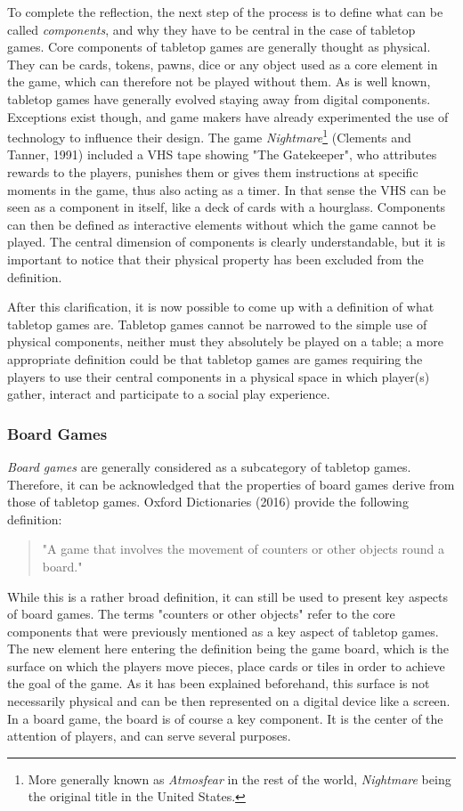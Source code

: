 To complete the reflection, the next step of the process is to define what can be called \textit{components}, and why they have to be central in the case of tabletop games. Core components of tabletop games are generally thought as physical. They can be cards, tokens, pawns, dice or any object used as a core element in the game, which can therefore not be played without them. As is well known, tabletop games have generally evolved staying away from digital components. Exceptions exist though, and game makers have already experimented the use of technology to influence their design. The game \textit{Nightmare}\footnote{More generally known as \textit{Atmosfear} in the rest of the world, \textit{Nightmare} being the original title in the United States.} (Clements and Tanner, 1991)\cite{game:atmo} included a VHS tape showing "The Gatekeeper", who attributes rewards to the players, punishes them or gives them instructions at specific moments in the game, thus also acting as a timer. In that sense the VHS can be seen as a component in itself, like a deck of cards with a hourglass.
Components can then be defined as interactive elements without which the game cannot be played. The central dimension of components is clearly understandable, but it is important to notice that their physical property has been excluded from the definition.

After this clarification, it is now possible to come up with a definition of what tabletop games are. Tabletop games cannot be narrowed to the simple use of physical components, neither must they absolutely be played on a table; a more appropriate definition could be that tabletop games are games requiring the players to use their central components in a physical space in which player(s) gather, interact and participate to a social play experience. 
\subsubsection{Board Games}
\textit{Board games} are generally considered as a subcategory of tabletop games. Therefore, it can be acknowledged that the properties of board games derive from those of tabletop games. Oxford Dictionaries (2016)\cite{web:oxford} provide the following definition:
\begin{quotation}
"A game that involves the movement of counters or other objects round a board."
\end{quotation}
While this is a rather broad definition, it can still be used to present key aspects of board games. The terms "counters or other objects" refer to the core components that were previously mentioned as a key aspect of tabletop games. The new element here entering the definition being the game board, which is the surface on which the players move pieces, place cards or tiles in order to achieve the goal of the game. As it has been explained beforehand, this surface is not necessarily physical and can be then represented on a digital device like a screen. In a board game, the board is of course a key component. It is the center of the attention of players, and can serve several purposes.

